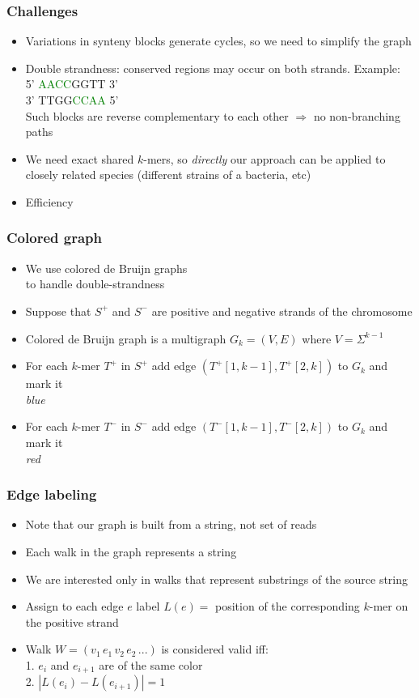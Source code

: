 \documentclass[svgnames,14pt]{beamer}
\begin{document}
\begin{frame}
\frametitle{Challenges}
\begin{itemize}
\item Variations in synteny blocks generate cycles, so we need to simplify the graph
\item Double strandness: conserved regions may occur on both strands. Example: \\
5' \textcolor{Green}{AACC}GGTT 3' \\
3' TTGG\textcolor{Green}{CCAA} 5' \\
Such blocks are reverse complementary to each other \( \Rightarrow \) no non-branching paths
\item We need exact shared \(k\)-mers, so \textit{directly} our approach can be applied
to closely related species (different strains of a bacteria, etc)
\item Efficiency
\end{itemize}
\end{frame}

\begin{frame}
\frametitle{Colored graph}
\begin{itemize}
\item We use colored de Bruijn graphs \\
 to handle double-strandness
\item Suppose that \( S^{+} \) and \( S^{-} \) are positive and negative strands of the chromosome
\item Colored de Bruijn graph  is a multigraph \( G_{k} = (V, E) \) where \( V =  \Sigma^{k - 1} \)
\item For each \(k\)-mer \(T^{+}\) in \(S^{+}\) add edge \( (T^{+}[1, k - 1], T^{+}[2, k]) \) to \( G_{k} \) and mark it \\ \textit{blue}
\item For each \(k\)-mer \(T^{-}\) in \(S^{-}\) add edge \( (T^{-}[1, k - 1], T^{-}[2, k]) \) to \( G_{k} \) and mark it \\ \textit{red}
\end{itemize}
\end{frame}

\begin{frame}
\frametitle{Edge labeling}
\begin{itemize}
\item Note that our graph is built from a string, not set of reads
\item Each walk in the graph represents a string
\item We are interested only in walks that represent substrings of the source string
\item Assign to each edge \( e \) label \( L(e) = \) position of the corresponding  \(k\)-mer on the positive strand
\item Walk  \( W = ( v_{1} \, e_{1} \, v_{2} \, e_{2} \, ... ) \) is considered valid iff: \\
1. \( e_{i} \) and \( e_{i + 1} \) are of the same color \\
2. \( | L(e_{i}) - L(e_{i + 1}) | = 1 \)
\end{itemize}
\end{frame}
\end{document}
